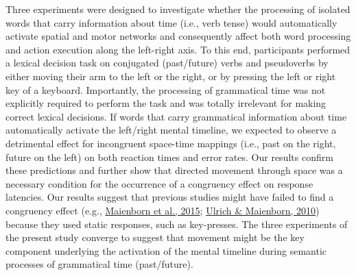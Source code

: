 \documentclass[
  a4paper,12pt,twoside,onecolumn,openright,final,oldfontcommands]{memoir}
\begin{document}
Three experiments were designed to investigate whether the processing of isolated words that carry information about time (i.e., verb tense) would automatically activate spatial and motor networks and consequently affect both word processing and action execution along the left-right axis. To this end, participants performed a lexical decision task on conjugated (past/future) verbs and pseudoverbs by either moving their arm to the left or the right, or by pressing the left or right key of a keyboard. Importantly, the processing of grammatical time was not explicitly required to perform the task and was totally irrelevant for making correct lexical decisions. If words that carry grammatical information about time automatically activate the left/right mental timeline, we expected to observe a detrimental effect for incongruent space-time mappings (i.e., past on the right, future on the left) on both reaction times and error rates. Our results confirm these predictions and further show that directed movement through space was a necessary condition for the occurrence of a congruency effect on response latencies. Our results suggest that previous studies might have failed to find a congruency effect (e.g., \protect\hyperlink{ref-maienborn_we_2015}{Maienborn et al., 2015}; \protect\hyperlink{ref-ulrich_leftright_2010}{Ulrich \& Maienborn, 2010}) because they used static responses, such as key-presses. The three experiments of the present study converge to suggest that movement might be the key component underlying the activation of the mental timeline during semantic processes of grammatical time (past/future).
\end{document}
